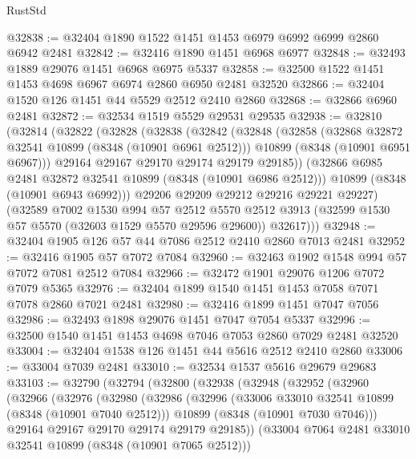 \begin{lexlean}{RustStd}
\begin{coremodule}
@32838 := @32404 @1890 @1522 @1451 @1453 @6979 @6992 @6999 @2860 @6942 @2481
@32842 := @32416 @1890 @1451 @6968 @6977
@32848 := @32493 @1889 @29076 @1451 @6968 @6975 @5337
@32858 := @32500 @1522 @1451 @1453 @4698 @6967 @6974 @2860 @6950 @2481 @32520
@32866 := @32404 @1520 @126 @1451 @44 @5529 @2512 @2410 @2860
@32868 := @32866 @6960 @2481
@32872 := @32534 @1519 @5529 @29531 @29535
@32938 := @32810
    (@32814
      (@32822
        (@32828
          (@32838
            (@32842
              (@32848
                (@32858
                  (@32868 @32872 @32541 @10899 (@8348 (@10901 @6961 @2512)))
                  @10899
                  (@8348 (@10901 @6951 @6967)))
                @29164
                @29167
                @29170
                @29174
                @29179
                @29185))
            (@32866 @6985 @2481 @32872 @32541 @10899 (@8348 (@10901 @6986 @2512)))
            @10899
            (@8348 (@10901 @6943 @6992)))
          @29206
          @29209
          @29212
          @29216
          @29221
          @29227)
        (@32589
          @7002
          @1530
          @994
          @57
          @2512
          @5570
          @2512
          @3913
          (@32599 @1530 @57 @5570 (@32603 @1529 @5570 @29596 @29600))
          @32617)))
@32948 := @32404 @1905 @126 @57 @44 @7086 @2512 @2410 @2860 @7013 @2481
@32952 := @32416 @1905 @57 @7072 @7084
@32960 := @32463 @1902 @1548 @994 @57 @7072 @7081 @2512 @7084
@32966 := @32472 @1901 @29076 @1206 @7072 @7079 @5365
@32976 := @32404 @1899 @1540 @1451 @1453 @7058 @7071 @7078 @2860 @7021 @2481
@32980 := @32416 @1899 @1451 @7047 @7056
@32986 := @32493 @1898 @29076 @1451 @7047 @7054 @5337
@32996 := @32500 @1540 @1451 @1453 @4698 @7046 @7053 @2860 @7029 @2481 @32520
@33004 := @32404 @1538 @126 @1451 @44 @5616 @2512 @2410 @2860
@33006 := @33004 @7039 @2481
@33010 := @32534 @1537 @5616 @29679 @29683
@33103 := @32790
    (@32794
      (@32800
        (@32938
          (@32948
            (@32952
              (@32960
                (@32966
                  (@32976
                    (@32980
                      (@32986
                        (@32996
                          (@33006 @33010 @32541 @10899 (@8348 (@10901 @7040 @2512)))
                          @10899
                          (@8348 (@10901 @7030 @7046)))
                        @29164
                        @29167
                        @29170
                        @29174
                        @29179
                        @29185))
                    (@33004 @7064 @2481 @33010 @32541 @10899 (@8348 (@10901 @7065 @2512)))

\end{coremodule}
\end{lexlean}
